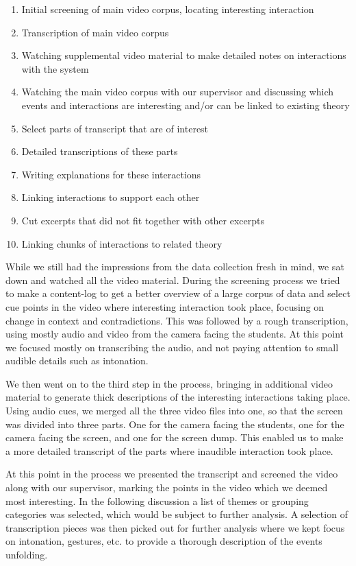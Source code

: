 \begin{enumerate}
\item{Initial screening of main video corpus, locating interesting interaction}
\item{Transcription of main video corpus}
\item{Watching supplemental video material to make detailed notes on interactions with the system}
\item{Watching the main video corpus with our supervisor and discussing which events and interactions are interesting and/or can be linked to existing theory}
\item{Select parts of transcript that are of interest}
\item{Detailed transcriptions of these parts}
\item{Writing explanations for these interactions}
\item{Linking interactions to support each other}
\item{Cut excerpts that did not fit together with other excerpts}
\item{Linking chunks of interactions to related theory}
\end{enumerate}

While we still had the impressions from the data collection fresh in mind, we sat down and watched all the video material. During the screening process we tried to make a content-log to get a better overview of a large corpus of data and select cue points in the video where interesting interaction took place, focusing on change in context and contradictions. This was followed by a rough transcription, using mostly audio and video from the camera facing the students. At this point we focused mostly on transcribing the audio, and not paying attention to small audible details such as intonation. 

We then went on to the third step in the process, bringing in additional video material to generate thick descriptions of the interesting interactions taking place. Using audio cues, we merged all the three video files into one, so that the screen was divided into three parts. One for the camera facing the students, one for the camera facing the screen, and one for the screen dump. This enabled us to make a more detailed transcript of the parts where inaudible interaction took place. 

At this point in the process we presented the transcript and screened the video along with our supervisor, marking the points in the video which we deemed most interesting. In the following discussion a list of themes or grouping categories was selected, which would be subject to further analysis. A selection of transcription pieces was then picked out for further analysis where we kept focus on intonation, gestures, etc. to provide a thorough description of the events unfolding. 

